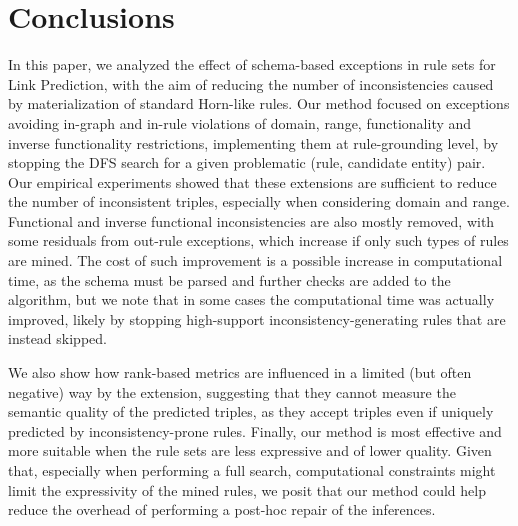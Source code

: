 \documentclass[a4paper,UKenglish,cleveref, autoref, thm-restate]{tgdk-v2021}
\begin{document}
\section{Conclusions}
In this paper, we analyzed the effect of schema-based exceptions in rule sets for Link Prediction, with the aim of reducing the number of inconsistencies caused by materialization of standard Horn-like rules. Our method focused on exceptions avoiding in-graph and in-rule violations of domain, range, functionality and inverse functionality restrictions, implementing them at rule-grounding level, by stopping the DFS search for a given problematic (rule, candidate entity) pair. Our empirical experiments showed that these extensions are sufficient to reduce the number of inconsistent triples, especially when considering domain and range. Functional and inverse functional inconsistencies are also mostly removed, with some residuals from out-rule exceptions, which increase if only such types of rules are mined. The cost of such improvement is a possible increase in computational time, as the schema must be parsed and further checks are added to the algorithm, but we note that in some cases the computational time was actually improved, likely by stopping high-support inconsistency-generating rules that are instead skipped. 

We also show how rank-based metrics are influenced in a limited (but often negative) way by the extension, suggesting that they cannot measure the semantic quality of the predicted triples, as they accept triples even if uniquely predicted by inconsistency-prone rules.
Finally, our method is most effective and more suitable when the rule sets are less expressive and of lower quality. Given that, especially when performing a full search, computational constraints might limit the expressivity of the mined rules, we posit that our method could help reduce the overhead of performing a post-hoc repair of the inferences.
\end{document}

